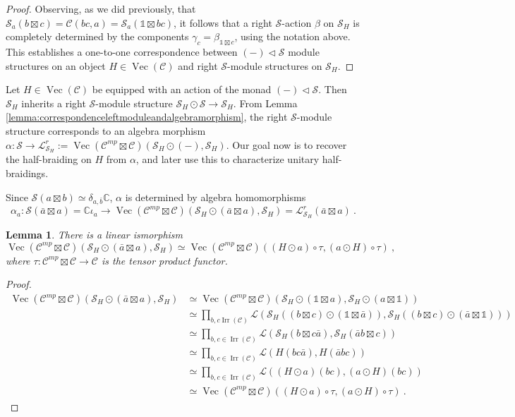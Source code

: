\documentclass[a4paper,11pt,reqno]{amsart}
\numberwithin{equation}{section}
\newtheorem{lemma}[theorem]{Lemma}
\theoremstyle{remark}
\theoremstyle{definition}
\newcommand{\C}{\mathbb C}
\newcommand{\cC}{\mathcal C}
\newcommand{\cL}{\mathcal L}
\newcommand{\cS}{\mathcal S}
\DeclareMathOperator{\Irr}{Irr}
\DeclareMathOperator{\Vect}{Vec}
\newcommand\un{{\mathds 1}}
\begin{document}
\begin{proof}
    Observing, as we did previously, that $\cS_a(b \boxtimes c) = \cC(bc,a) = \cS_a(\un \boxtimes bc)$, it follows that a right $\cS$-action $\beta$ on $\cS_H$ is completely determined by the components
    $\gamma_c = \beta_{\un \boxtimes c}$, using the notation above. This establishes a one-to-one correspondence between $(-) \triangleleft \cS$ module structures on an object $H \in \Vect(\cC)$ and right  $\cS$-module structures on $\cS_H$.
\end{proof}

Let $H \in \Vect(\cC)$ be equipped with an action of the monad $(-) \triangleleft \cS$. Then $\cS_H$ inherits a right $\cS$-module structure $\cS_H \odot \cS \to \cS_H$. From Lemma \ref{lemma:correspondenceleftmoduleandalgebramorphism}, the right $\cS$-module structure corresponds to an algebra morphism $\alpha: \cS \to  \cL^r_{\cS_H} := \Vect(\cC^{mp} \boxtimes \cC)(\cS_H \odot (-), \cS_H)$. Our goal now is to recover the half-braiding on $H$ from $\alpha$, and later use this to characterize unitary half-braidings. 

Since $\cS( a\boxtimes b) \simeq \delta_{a, \bar{b}} \C$, $\alpha$ is determined by algebra homomorphisms
\[ \alpha_a : \cS(\bar{a} \boxtimes a) = \C \iota_a \to \Vect(\cC^{mp} \boxtimes \cC)(\cS_H \odot (\bar{a} \boxtimes a), \cS_H)  = \cL_{\cS_H}^r(\bar{a} \boxtimes a)\ .\]

\begin{lemma}
	There is a linear ismorphism
	\[
	\Vect(\cC^{mp} \boxtimes \cC) (\cS_H \odot (\bar{a} \boxtimes a), \cS_H) \simeq \Vect(\cC^{mp} \boxtimes \cC)((H \odot a) \circ \tau, (a \odot H) \circ \tau ) \ , 
	\]
	where $\tau: \cC^{mp} \boxtimes \cC \to \cC$ is the tensor product functor.
\end{lemma}

\begin{proof}
	\begin{align*}
		\Vect(\cC^{mp} \boxtimes \cC) (\cS_H \odot (\bar{a} \boxtimes a), \cS_H) & \simeq \Vect(\cC^{mp} \boxtimes \cC) (\cS_H \odot (\un \boxtimes a), \cS_H\odot (a \boxtimes \un)) \\
		& \simeq \prod_{b,c \Irr(\cC)} \cL (\cS_H ((b\boxtimes c) \odot (\un \boxtimes \bar{a})), \cS_H((b \boxtimes c) \odot (\bar{a} \boxtimes \un))) \\
		& \simeq \prod_{b,c \in \Irr(\cC)} \cL (\cS_H(b \boxtimes c\bar{a}), \cS_H(\bar{a} b \boxtimes c)) \\
		& \simeq \prod_{b,c \in \Irr(\cC)} \cL(H(bc\bar{a}),H(\bar{a}bc)) \\
		& \simeq \prod_{b,c \in \Irr(\cC)} \cL((H \odot a)(bc), (a \odot H)(bc)) \\
		& \simeq \Vect(\cC^{mp} \boxtimes \cC)((H \odot a) \circ \tau, (a \odot H) \circ \tau ) \ .	
	\end{align*}
\end{proof}
\end{document}
